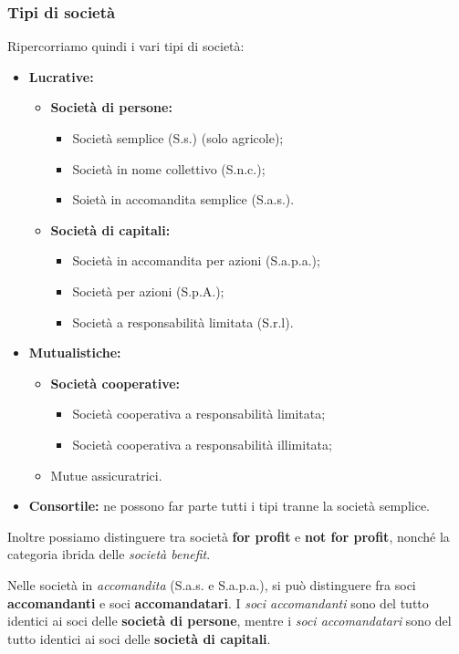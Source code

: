 \documentclass[a4paper,11pt]{article}
\begin{document}
\subsubsection{Tipi di società}
Ripercorriamo quindi i vari tipi di società:
\begin{itemize}
	\item \textbf{Lucrative:}
		\begin{itemize}
			\item \textbf{Società di persone:}
				\begin{itemize}
					\item Società semplice (S.s.) (solo agricole);
					\item Società in nome collettivo (S.n.c.);
					\item Soietà in accomandita semplice (S.a.s.).
				\end{itemize}
			\item \textbf{Società di capitali:}
				\begin{itemize}
					\item Società in accomandita per azioni (S.a.p.a.);
					\item Società per azioni (S.p.A.);
					\item Società a responsabilità limitata (S.r.l).
				\end{itemize}
		\end{itemize}
	\item \textbf{Mutualistiche:}
		\begin{itemize}
			\item \textbf{Società cooperative:}
				\begin{itemize}
					\item Società cooperativa a responsabilità limitata;
					\item Società cooperativa a responsabilità illimitata;
				\end{itemize}
			\item Mutue assicuratrici.
		\end{itemize}
	\item \textbf{Consortile:} ne possono far parte tutti i tipi tranne la società semplice.
\end{itemize}

Inoltre possiamo distinguere tra società \textbf{for profit} e \textbf{not for profit}, nonché la categoria ibrida delle \textit{società benefit}.

Nelle società in \textit{accomandita} (S.a.s. e S.a.p.a.), si può distinguere fra soci \textbf{accomandanti} e soci \textbf{accomandatari}.
I \textit{soci accomandanti} sono del tutto identici ai soci delle \textbf{società di persone}, mentre i \textit{soci accomandatari} sono del tutto identici ai soci delle \textbf{società di capitali}.
\end{document}
